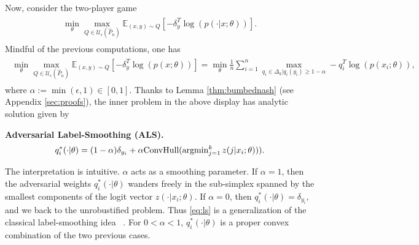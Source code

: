 Now, consider the two-player game
\begin{eqnarray}
  \begin{split}
    \min_{\theta}\max_{Q \in \mathcal U_\epsilon(\hat{P}_n)} \mathbb E_{(x,y)
      \sim Q}[-\delta_y^T\log(p(\cdot|x;\theta))].
  \end{split}
  \label{eq:grand}
\end{eqnarray}
Mindful of the previous computations, one has
\begin{eqnarray}
  \begin{split}
    \min_{\theta}\max_{Q \in \mathcal U_\epsilon(\hat{P}_n)} \mathbb E_{(x,y) \sim
      Q}[-\delta_y^T\log(p(x;\theta))]
    =\min_{\theta}\frac{1}{n}\sum_{i=1}^n\max_{q_i \in
      \Delta_k|q_i(y_i) \ge 1-\alpha} -q_i^T\log(p(x_i;\theta)),
    \end{split}
\end{eqnarray}
where  $\alpha := \min(\epsilon,1) \in [0, 1]$. Thanks to Lemma
\ref{thm:bumbednash} (see Appendix \ref{sec:proofs}), the inner problem in the above
display has analytic solution given by
\begin{mdframed}
  \textbf{Adversarial Label-Smoothing (ALS).}
\begin{eqnarray}
  q_i^*(\cdot|\theta) = (1-\alpha) \delta_{y_i} +
  \alpha\text{ConvHull}(\operatorname{argmin}_{j=1}^kz(j|x_i;\theta))).
  \label{eq:ls}
\end{eqnarray}
\end{mdframed}
The interpretation is intuitive. $\alpha$ acts as a smoothing parameter.
If $\alpha = 1$, then the adversarial weights $q^*_i(\cdot|\theta)$ wanders freely
in the sub-simplex spanned by the smallest components of the logit vector
$z(\cdot|x_i;\theta)$. If $\alpha=0$, then $q^*_i(\cdot|\theta)=\delta_{y_i}$,
and we back to the unrobustified problem. Thus \eqref{eq:ls} is a generalization
of the classical label-smoothing idea ~\citep{labelsmoothing}. For $0 < \alpha < 1$, $q^*_i(\cdot|\theta)$ is a
proper convex combination of the two previous cases.

